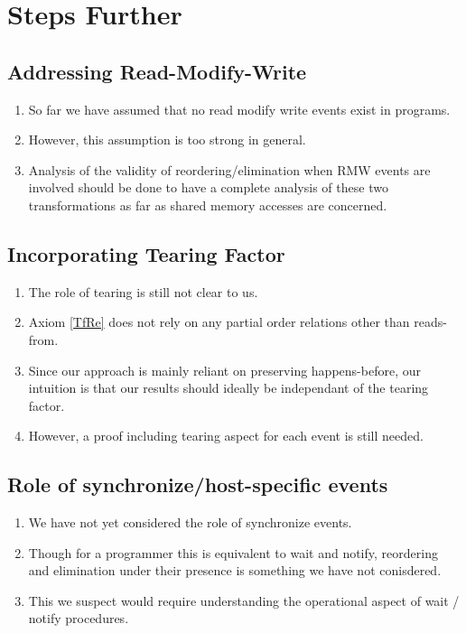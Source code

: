 \section{Steps Further}

    \subsection{Addressing Read-Modify-Write}
    \begin{enumerate}
        \item So far we have assumed that no read modify write events exist in programs.
        \item However, this assumption is too strong in general.
        \item Analysis of the validity of reordering/elimination when RMW events are involved should  be done to have a complete analysis of these two transformations as far as shared memory accesses are concerned.
    \end{enumerate}

    \subsection{Incorporating Tearing Factor}
    \begin{enumerate}
        \item The role of tearing is still not clear to us.
        \item Axiom \ref{TfRe} does not rely on any partial order relations other than reads-from. 
        \item Since our approach is mainly reliant on preserving happens-before, our intuition is that our results should ideally be independant of the tearing factor.
        \item However, a proof including tearing aspect for each event is still needed.   
    \end{enumerate}

    \subsection{Role of synchronize/host-specific events}
    \begin{enumerate}
        \item We have not yet considered the role of synchronize events. 
        \item Though for a programmer this is equivalent to wait and notify, reordering and elimination under their presence is something we have not conisdered. 
        \item This we suspect would require understanding the operational aspect of wait / notify procedures.
    \end{enumerate}

